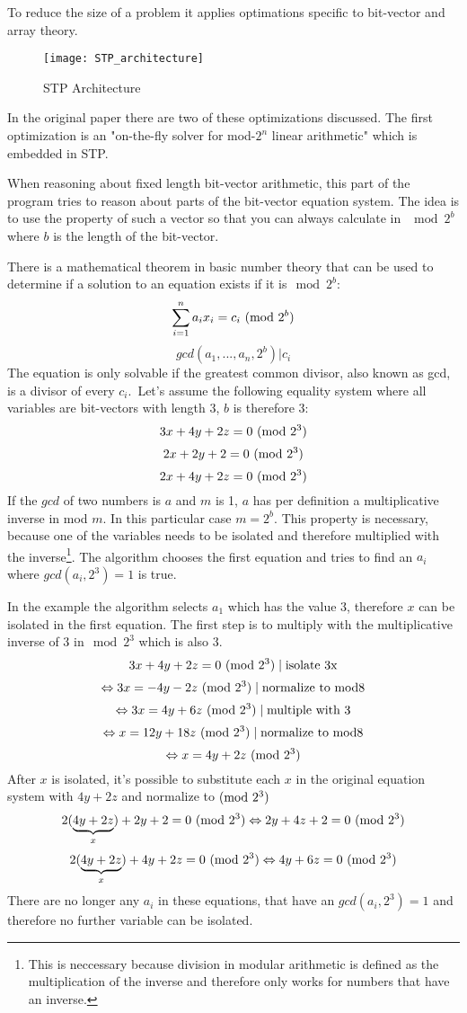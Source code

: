 
To reduce the size of a problem it applies optimations specific to bit-vector and array theory.
\begin{figure}
\texttt{[image: STP\_architecture]}
\centering
\caption{STP Architecture}
\label{fig:STP_architecture}
\end{figure}
In the original paper \cite{Ganesh:2007:DPB:1770351.1770421} there are two of these optimizations discussed. The first optimization is an "on-the-fly solver for mod-$2^n$ linear arithmetic" which is embedded in STP. 

When reasoning about fixed length bit-vector arithmetic, this part of the program tries to reason about parts of the bit-vector equation system.
The idea is to use the property of such a vector so that you can always calculate in $\mod{2^b}$ where $b$ is the length of the bit-vector.

There is a mathematical theorem in basic number theory that can be used to determine if a solution to an equation exists if it is$\mod{2^b}$:
$$\sum_{i=1}^{n} a_ix_i = c_i  \ (\mathrm{mod}\ 2^b)$$
$$gcd(a_1,...,a_n,2^b) | c_i$$
The equation is only solvable if the greatest common divisor, also known as gcd, is a divisor of every $c_i$.\
Let's assume the following equality system where all variables are bit-vectors with length 3, $b$ is therefore 3:
\todo{replace system with own example}
$$3x+4y+2z=0 \ (\mathrm{mod}\ 2^3)$$
$$2x+2y+2=0  \ (\mathrm{mod}\ 2^3)$$
$$2x+4y+2z=0 \ (\mathrm{mod}\ 2^3)$$
If the $gcd$ of two numbers is $a$ and $m$ is 1, $a$ has per definition a multiplicative inverse in mod $m$. In this particular case $m=2^b$. This property is necessary, because one of the variables needs to be isolated and therefore multiplied with the inverse\footnote{This is neccessary because division in modular arithmetic is defined as the multiplication of the inverse and therefore only works for numbers that have an inverse.}.
The algorithm chooses the first equation and tries to find an $a_i$ where $gcd(a_i,2^3) = 1$ is true.

In the example the algorithm selects $a_1$ which has the value $3$, therefore $x$ can be isolated in the first equation.
The first step is to multiply with the multiplicative inverse of 3 in$\mod{2^3}$ which is also 3.
$$3x+4y+2z = 0 \ (\mathrm{mod}\ 2^3) \mid \text{isolate 3x}$$
$$\Leftrightarrow 3x=-4y-2z  \ (\mathrm{mod}\ 2^3)  \mid \text{normalize to mod8}$$
$$\Leftrightarrow 3x=4y+6z  \ (\mathrm{mod}\ 2^3)  \mid \text{multiple with 3}$$
$$\Leftrightarrow x=12y+18z \ (\mathrm{mod}\ 2^3)  \mid \text{normalize to mod8}$$
$$\Leftrightarrow x=4y+2z \ (\mathrm{mod}\ 2^3)$$
After $x$ is isolated, it's possible to substitute each $x$ in the original equation system with $4y+2z$ and normalize to$\ (\mathrm{mod}\ 2^3)$
$$2(\underbrace{4y+2z}_{x})+2y+2=0 \ (\mathrm{mod}\ 2^3) \Leftrightarrow 2y + 4z + 2 = 0\ (\mathrm{mod}\ 2^3) $$
$$2(\underbrace{4y+2z}_{x})+ 4y + 2z = 0 \ (\mathrm{mod}\ 2^3) \Leftrightarrow 4y + 6z = 0\ (\mathrm{mod}\ 2^3) $$
There are no longer any ${a_i}$ in these equations, that have an $gcd(a_i,2^3) = 1$ and therefore no further variable can be isolated.

